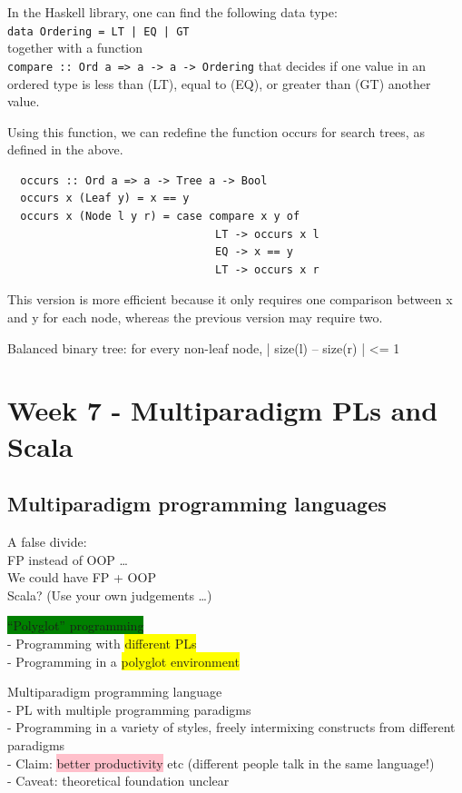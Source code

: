 \documentclass[tikz,border=10pt]{project_plan}
\begin{document}
In the Haskell library, one can find the following data type:\\
\lstinline?data Ordering = LT | EQ | GT?\\
together with a function\\
\lstinline?compare :: Ord a => a -> a -> Ordering?
that decides if one value in an ordered type is less than (LT), equal to
(EQ), or greater than (GT) another value.

Using this function, we can redefine the function occurs for search trees, as
defined in the above.
\begin{lstlisting}
  occurs :: Ord a => a -> Tree a -> Bool
  occurs x (Leaf y) = x == y
  occurs x (Node l y r) = case compare x y of
                                LT -> occurs x l
                                EQ -> x == y
                                LT -> occurs x r
\end{lstlisting}
This version is more efficient because it only requires one
comparison between x and y for each node, whereas the previous
version may require two.

Balanced binary tree: for every non-leaf node,
| size(l) – size(r) | <= 1


\chapter{Week 7 - Multiparadigm PLs and Scala}

\section{Multiparadigm programming languages}

A false divide:\\
FP instead of OOP …\\
We could have FP + OOP\\
Scala? (Use your own judgements …)

\colorbox{green}{“Polyglot” programming}\\
- Programming with \colorbox{yellow}{different PLs}\\
- Programming in a \colorbox{yellow}{polyglot environment}

Multiparadigm programming language\\
- PL with multiple programming paradigms\\
- Programming in a variety of styles, freely intermixing
constructs from different paradigms\\
- Claim: \colorbox{pink}{better productivity} etc (different people talk in the
same language!)\\
- Caveat: theoretical foundation unclear
\end{document}
